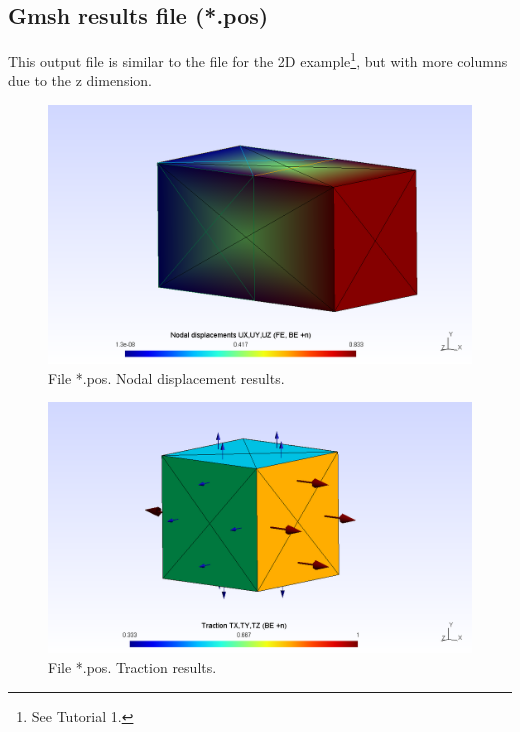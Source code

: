\documentclass[a4]{article}
\begin{document}
\subsection{Gmsh results file (*.pos)}

This output file is similar to the file for the 2D example\footnote{See Tutorial 1.}, but with more columns due to the z dimension. 

\begin{figure}[h]
	\centering
	\includegraphics[scale = 0.5]{displacement.png}
	\caption{File *.pos. Nodal displacement results.}
	\label{fig:displacement}
\end{figure}

\begin{figure}
	\centering
	\includegraphics[scale = 0.5]{traction.png}
	\caption{File *.pos. Traction results.}
	\label{fig:traction}
\end{figure}
\end{document}
